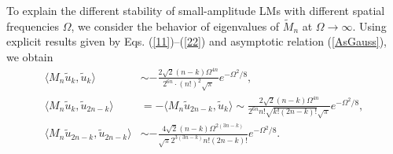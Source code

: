 \documentclass[aps,preprint,showkeys,
]{revtex4}
\newcommand{\la}{\langle}
\newcommand{\ra}{\rangle}
\begin{document}
To explain the different stability of small-amplitude LMs with different
spatial frequencies $\Omega $, we consider the behavior of eigenvalues of $%
\tilde{M}_{n}$ at $\Omega \rightarrow \infty $. Using explicit results given
by Eqs. (\ref{11})--(\ref{22}) and asymptotic relation (\ref{AsGauss}), we
obtain %
\begin{align}
\langle M_{n}\tilde{u}_{k},\tilde{u}_{k}\rangle & \sim -\frac{2\sqrt{2}%
(n-k)\Omega ^{4n}}{2^{6n}\cdot (n!)^{2}\sqrt{\pi }}e^{-\Omega ^{2}/8}, \\%
[2mm]
\langle M_{n}\tilde{u}_{k},\tilde{u}_{2n-k}\rangle & =-\langle M_{n}\tilde{u}%
_{2n-k},\tilde{u}_{k}\rangle \sim \frac{2\sqrt{2}(n-k)\Omega ^{4n}}{2^{6n}n!%
\sqrt{k!(2n-k)!}\sqrt{\pi }}e^{-\Omega ^{2}/8}, \\
\langle M_{n}\tilde{u}_{2n-k},\tilde{u}_{2n-k}\rangle & \sim -\frac{4\sqrt{2}%
(n-k)\Omega ^{2(3n-k)}}{\sqrt{\pi }2^{3(3n-k)}n!(2n-k)!}e^{-\Omega ^{2}/8}.
\end{align}%
\end{document}
